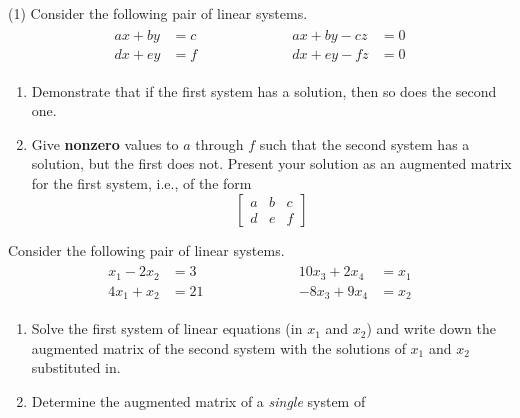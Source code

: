 \begin{tasks}[resume, style=enumerate](1)
\task
  Consider the following pair of linear systems.
  \begin{align*}
    \begin{aligned}
      ax + by &= c \\
      dx + ey &= f
    \end{aligned}
    \hspace{1in}
    \begin{aligned}
      ax + by - cz &= 0 \\
      dx + ey - fz &= 0
    \end{aligned}
  \end{align*}
  \begin{enumerate}[label=(\alph*)]
  \item
    Demonstrate that if the first system has a solution, then so does
    the second one.
  \item
    Give \textbf{nonzero} values to $a$ through $f$ such that the
    second system has a solution, but the first does not.  Present
    your solution as an augmented matrix for the first system, i.e.,
    of the form
    \begin{displaymath}
      \begin{bmatrix}
        a & b & c \\
        d & e & f
      \end{bmatrix}
    \end{displaymath}
  \end{enumerate}
\task
  Consider the following pair of linear systems.
  \begin{align*}
    \begin{aligned}
      x_1 - 2x_2 &= 3 \\
      4x_1 + x_2 &= 21
    \end{aligned}
    \hspace{1in}
    \begin{aligned}
      10x_3 + 2x_4 &= x_1 \\
      -8x_3 + 9x_4 &= x_2
    \end{aligned}
  \end{align*}
  \begin{enumerate}[label=(\alph*)]
  \item
    Solve the first system of linear equations (in $x_1$ and $x_2$)
    and write down the augmented matrix of the second system with the
    solutions of $x_1$ and $x_2$ substituted in.
  \item
    Determine the augmented matrix of a \textit{single} system of

\end{enumerate}
\end{tasks}
